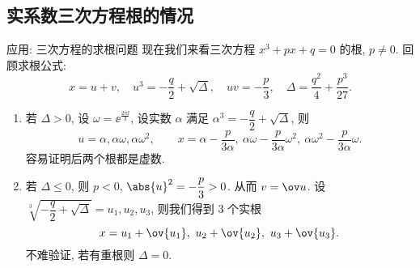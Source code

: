 \subsection{实系数三次方程根的情况}


\begin{frame}{应用: 三次方程的求根问题\noexer}
	\onslide<+->
	现在我们来看三次方程 $x^3+px+q=0$ 的根, $p\neq 0$.
	\onslide<+->
	回顾求根公式:
	\[
		x=u+v,\quad
		u^3=-\frac q2+\sqrt{\Delta},\quad
		uv=-\frac p3,\quad
		\Delta=\frac{q^2}4+\frac{p^3}{27}.
	\]
	\bigdel
	\begin{enumerate}
		\item 若 $\Delta>0$, 设 $\omega=\ee^{\frac{2\pi\ii}3}$, 设实数 $\alpha$ 满足 $\alpha^3=-\dfrac q2+\sqrt{\Delta}$,
		\onslide<+->
		则
		\[
			u=\alpha,\alpha\omega,\alpha\omega^2,\qquad
			x=\alpha-\frac p{3\alpha},\ 
				\alpha\omega-\frac p{3\alpha} \omega^2,\ 
				\alpha\omega^2-\frac p{3\alpha} \omega.
		\]
		\onslide<+->
		容易证明后两个根都是虚数.
		\item 若 $\Delta\le 0$, 则 $p<0$, $\abs{u}^2=-\dfrac p3>0$. 
		\onslide<+->
		从而 $v=\ov u$.
		\onslide<+->
		设 $\sqrt[3]{-\dfrac q2+\sqrt{\Delta}}=u_1,u_2,u_3$,
		\onslide<+->
		则我们得到 $3$ 个实根
		\[
			x=u_1+\ov{u_1},\ u_2+\ov{u_2},\ u_3+\ov{u_3}.
		\]
		\onslide<+->
		不难验证, 若有重根则 $\Delta=0$.
	\end{enumerate}
\end{frame}

